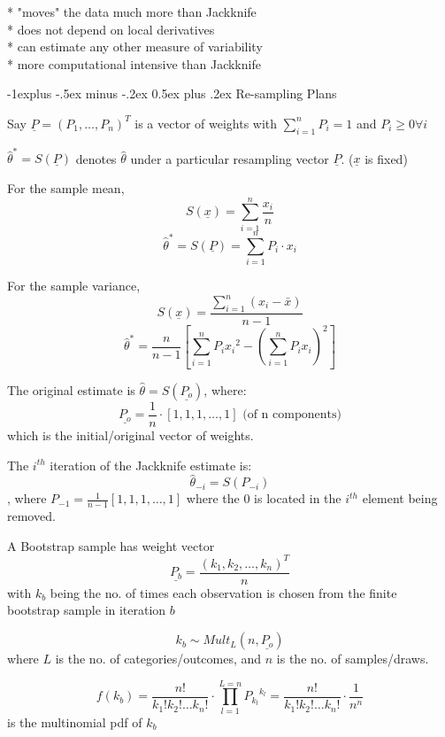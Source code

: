 \documentclass[10pt,landscape]{article}
\makeatletter
\renewcommand{\subsection}{\@startsection{subsection}{2}{0mm}%
                                {-1explus -.5ex minus -.2ex}%
                                {0.5ex plus .2ex}%
                                {\normalfont\normalsize\bfseries}}
\makeatother
\begin{document}
\begin{multicols}{3}
\medskip
* "moves" the data much more than Jackknife \\
* does not depend on local derivatives \\
* can estimate any other measure of variability \\
* more computational intensive than Jackknife

\subsection{Re-sampling Plans} %

Say $\underline{P} = (P_1, \hdots, P_n)^T$ is a vector of weights with $\sum_{i = 1}^{n} P_i = 1$ and $P_i \geq 0 \forall i$

\medskip
$\hat{\theta}^* = S(\underline{P})$ denotes $\hat{\theta}$ under a particular resampling vector $\underline{P}$. ($\underline{x}$ is fixed)

\medskip
For the sample mean,
$$ S(\underline{x}) = \sum_{i = 1}^{n} \frac{x_i}{n} $$
$$ \hat{\theta}^* = S(\underline{P}) = \sum_{i = 1}^{n} P_i \cdot x_i $$

\medskip
For the sample variance,
$$ S(\underline{x}) = \frac{\sum_{i = 1}^{n} (x_i - \bar{x})}{n - 1} $$
$$ \hat{\theta}^* = \frac{n}{n - 1} \left[\sum_{i = 1}^n P_i {x_i}^2 - \left( \sum_{i = 1}^n P_i x_i \right)^2\right] $$

\medskip
The original estimate is $\hat{\theta} = S(\underline{P_o})$, where: $$ \underline{P_o} = \frac{1}{n} \cdot [1, 1, 1, \hdots, 1] \text{ (of n components)}$$ which is the initial/original vector of weights.

\medskip
The $i^{th}$ iteration of the Jackknife estimate is: $$ \hat{\theta}_{-i} = S(P_{-i}) $$, where $P_{-1} = \frac{1}{n - 1} [1, 1, 1, \hdots, 1]$ where the $0$ is located in the $i^{th}$ element being removed.

\medskip
A Bootstrap sample has weight vector $$ \underline{P_b} = \frac{(k_1, k_2, \hdots, k_n)^T}{n} $$ with $k_b$ being the no. of times each observation is chosen from the finite bootstrap sample in iteration $b$

$$ k_b \sim Mult_L(n, \underline{P_o}) $$ where $L$ is the no. of categories/outcomes, and $n$ is the no. of samples/draws.

$$ f (k_b) = \frac{n!}{k_1! k_2! \hdots k_n!} \cdot \prod_{l = 1}^{L = n} {P_{k_l}}^{k_l} = \frac{n!}{k_1! k_2! \hdots k_n!} \cdot \frac{1}{n^n} $$ is the multinomial pdf of $k_b$


\end{multicols}
\end{document}
